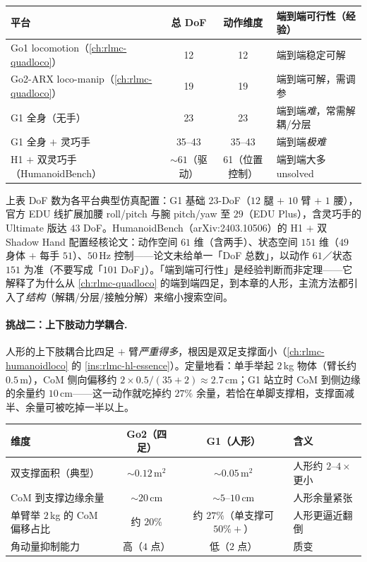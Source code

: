 \begin{center}
\small
\begin{tabular}{lccl}
\hline
平台 & 总 DoF & 动作维度 & 端到端可行性（经验） \\
\hline
Go1 locomotion（\cref{ch:rlmc-quadloco}） & 12 & 12 & 端到端稳定可解 \\
Go2-ARX loco-manip（\cref{ch:rlmc-quadloco}） & 19 & 19 & 端到端可解，需调参 \\
G1 全身（无手） & 23 & 23 & 端到端\emph{难}，常需解耦/分层 \\
G1 全身 $+$ 灵巧手 & 35--43 & 35--43 & 端到端\emph{极难} \\
H1 $+$ 双灵巧手（HumanoidBench） & $\sim 61$（驱动） & 61（位置控制） & 端到端大多 unsolved \\
\hline
\end{tabular}
\end{center}

上表 DoF 数为各平台典型仿真配置：G1 基础 $23$-DoF（$12$ 腿 $+$ $10$ 臂 $+$ $1$ 腰），官方 EDU 线扩展加腰 roll/pitch 与腕 pitch/yaw 至 $29$（EDU Plus），含灵巧手的 Ultimate 版达 $43$ DoF。HumanoidBench（arXiv:2403.10506）的 H1 $+$ 双 Shadow Hand 配置经核论文：动作空间 $61$ 维（含两手）、状态空间 $151$ 维（$49$ 身体 $+$ 每手 $51$）、$50$\,Hz 控制——论文未给单一「DoF 总数」，以动作 $61$／状态 $151$ 为准（不要写成「$101$ DoF」）。「端到端可行性」是经验判断而非定理——它解释了为什么从 \cref{ch:rlmc-quadloco} 的端到端四足，到本章的人形，主流方法都引入了\emph{结构}（解耦/分层/接触分解）来缩小搜索空间。

\paragraph{挑战二：上下肢动力学耦合.}
人形的上下肢耦合比四足 $+$ 臂\emph{严重得多}，根因是双足支撑面小（\cref{ch:rlmc-humanoidloco} 的 \cref{ins:rlmc-hl-essence}）。定量地看：单手举起 $2$\,kg 物体（臂长约 $0.5$\,m），CoM 侧向偏移约 $2\times0.5/(35+2)\approx 2.7$\,cm；G1 站立时 CoM 到侧边缘的余量约 $10$\,cm——这一动作就吃掉约 $27\%$ 余量，若恰在单脚支撑相，支撑面减半、余量可被吃掉一半以上。

\begin{center}
\small
\begin{tabular}{lccl}
\hline
维度 & Go2（四足） & G1（人形） & 含义 \\
\hline
双支撑面积（典型） & $\sim 0.12\,\mathrm{m}^2$ & $\sim 0.05\,\mathrm{m}^2$ & 人形约 $2$--$4\times$ 更小 \\
CoM 到支撑边缘余量 & $\sim 20$\,cm & $\sim 5$--$10$\,cm & 人形余量紧张 \\
单臂举 $2$\,kg 的 CoM 偏移占比 & 约 $20\%$ & 约 $27\%$（单支撑可 $50\%+$） & 人形更逼近翻倒 \\
角动量抑制能力 & 高（$4$ 点） & 低（$2$ 点） & 质变 \\
\hline
\end{tabular}
\end{center}


